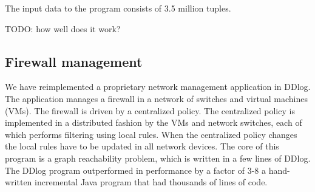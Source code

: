 The input data to the program consists of 3.5 million tuples.

TODO: how well does it work?

\subsection{Firewall management}

We have reimplemented a proprietary network management application in
DDlog.  The application manages a firewall in a network of switches
and virtual machines (VMs).  The firewall is driven by a centralized
policy.  The centralized policy is implemented in a distributed
fashion by the VMs and network switches, each of which performs
filtering using local rules.  When the centralized policy changes the
local rules have to be updated in all network devices.  The core
of this program is a graph reachability problem, which is written in a
few lines of DDlog.  The DDlog program outperformed in performance by
a factor of 3-8 a hand-written incremental Java program that had
thousands of lines of code.
